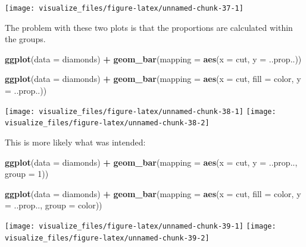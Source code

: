 \documentclass[]{book}
\newenvironment{Shaded}{\begin{snugshade}}{\end{snugshade}}
\newcommand{\DataTypeTok}[1]{\textcolor[rgb]{0.13,0.29,0.53}{#1}}
\newcommand{\DecValTok}[1]{\textcolor[rgb]{0.00,0.00,0.81}{#1}}
\newcommand{\KeywordTok}[1]{\textcolor[rgb]{0.13,0.29,0.53}{\textbf{#1}}}
\newcommand{\NormalTok}[1]{#1}
\newcommand{\OperatorTok}[1]{\textcolor[rgb]{0.81,0.36,0.00}{\textbf{#1}}}
\newcommand{\StringTok}[1]{\textcolor[rgb]{0.31,0.60,0.02}{#1}}
\theoremstyle{plain}
\theoremstyle{remark}
\begin{document}
\begin{center}\texttt{[image: visualize\_files/figure-latex/unnamed-chunk-37-1]} \end{center}

The problem with these two plots is that the proportions are calculated within the groups.

\begin{Shaded}
\begin{Highlighting}[]
\KeywordTok{ggplot}\NormalTok{(}\DataTypeTok{data =}\NormalTok{ diamonds) }\OperatorTok{+}
\StringTok{  }\KeywordTok{geom_bar}\NormalTok{(}\DataTypeTok{mapping =} \KeywordTok{aes}\NormalTok{(}\DataTypeTok{x =}\NormalTok{ cut, }\DataTypeTok{y =}\NormalTok{ ..prop..))}

\KeywordTok{ggplot}\NormalTok{(}\DataTypeTok{data =}\NormalTok{ diamonds) }\OperatorTok{+}
\StringTok{  }\KeywordTok{geom_bar}\NormalTok{(}\DataTypeTok{mapping =} \KeywordTok{aes}\NormalTok{(}\DataTypeTok{x =}\NormalTok{ cut, }\DataTypeTok{fill =}\NormalTok{ color, }\DataTypeTok{y =}\NormalTok{ ..prop..))}
\end{Highlighting}
\end{Shaded}

\begin{center}\texttt{[image: visualize\_files/figure-latex/unnamed-chunk-38-1]} \texttt{[image: visualize\_files/figure-latex/unnamed-chunk-38-2]} \end{center}

This is more likely what was intended:

\begin{Shaded}
\begin{Highlighting}[]
\KeywordTok{ggplot}\NormalTok{(}\DataTypeTok{data =}\NormalTok{ diamonds) }\OperatorTok{+}
\StringTok{  }\KeywordTok{geom_bar}\NormalTok{(}\DataTypeTok{mapping =} \KeywordTok{aes}\NormalTok{(}\DataTypeTok{x =}\NormalTok{ cut, }\DataTypeTok{y =}\NormalTok{ ..prop.., }\DataTypeTok{group =} \DecValTok{1}\NormalTok{))}

\KeywordTok{ggplot}\NormalTok{(}\DataTypeTok{data =}\NormalTok{ diamonds) }\OperatorTok{+}
\StringTok{  }\KeywordTok{geom_bar}\NormalTok{(}\DataTypeTok{mapping =} \KeywordTok{aes}\NormalTok{(}\DataTypeTok{x =}\NormalTok{ cut, }\DataTypeTok{fill =}\NormalTok{ color, }\DataTypeTok{y =}\NormalTok{ ..prop.., }\DataTypeTok{group =}\NormalTok{ color))}
\end{Highlighting}
\end{Shaded}

\begin{center}\texttt{[image: visualize\_files/figure-latex/unnamed-chunk-39-1]} \texttt{[image: visualize\_files/figure-latex/unnamed-chunk-39-2]} \end{center}
\end{document}
